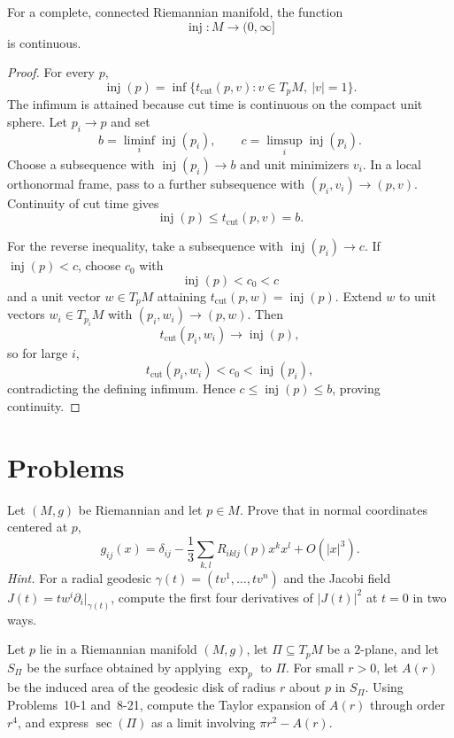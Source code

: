 \begin{proposition}
\label{prop:continuity-injectivity-radius}
For a complete, connected Riemannian manifold, the function
\[
\operatorname{inj}\colon M\longrightarrow(0,\infty]
\]
is continuous.

\begin{proof}
\sketch For every $p$,
\[
\operatorname{inj}(p)
=\inf\{t_{\mathrm{cut}}(p,v):v\in T_pM,\ |v|=1\}.
\]
The infimum is attained because cut time is continuous on the compact unit
sphere. Let $p_i\to p$ and set
\[
b=\liminf_i\operatorname{inj}(p_i),
\qquad
c=\limsup_i\operatorname{inj}(p_i).
\]
Choose a subsequence with $\operatorname{inj}(p_i)\to b$ and unit minimizers
$v_i$. In a local orthonormal frame, pass to a further subsequence with
$(p_i,v_i)\to(p,v)$. Continuity of cut time gives
\[
\operatorname{inj}(p)
\leq t_{\mathrm{cut}}(p,v)
=b.
\]

For the reverse inequality, take a subsequence with
$\operatorname{inj}(p_i)\to c$. If $\operatorname{inj}(p)<c$, choose
$c_0$ with
\[
\operatorname{inj}(p)<c_0<c
\]
and a unit vector $w\in T_pM$ attaining
$t_{\mathrm{cut}}(p,w)=\operatorname{inj}(p)$. Extend $w$ to unit vectors
$w_i\in T_{p_i}M$ with $(p_i,w_i)\to(p,w)$. Then
\[
t_{\mathrm{cut}}(p_i,w_i)\longrightarrow\operatorname{inj}(p),
\]
so for large $i$,
\[
t_{\mathrm{cut}}(p_i,w_i)<c_0<\operatorname{inj}(p_i),
\]
contradicting the defining infimum. Hence
$c\leq\operatorname{inj}(p)\leq b$, proving continuity.
\end{proof}
\end{proposition}
\section{Problems}

\begin{exercise}
\label{prob:taylor-series-metric-tensor}

Let $(M,g)$ be Riemannian and let $p\in M$. Prove that in normal coordinates
centered at $p$,
\[
g_{ij}(x)
=\delta_{ij}-\frac13\sum_{k,l}R_{iklj}(p)x^kx^l+O(|x|^3).
\]
\emph{Hint.} For a radial geodesic
$\gamma(t)=(tv^1,\ldots,tv^n)$ and the Jacobi field
$J(t)=tw^i\partial_i|_{\gamma(t)}$, compute the first four derivatives of
$|J(t)|^2$ at $t=0$ in two ways.
\end{exercise}

\begin{exercise}
\label{prob:area-geodesic-disk}

Let $p$ lie in a Riemannian manifold $(M,g)$, let
$\Pi\subseteq T_pM$ be a $2$-plane, and let
$S_\Pi$ be the surface obtained by applying $\exp_p$ to $\Pi$. For small
$r>0$, let $A(r)$ be the induced area of the geodesic disk of radius $r$
about $p$ in $S_\Pi$. Using Problems~10-1 and~8-21, compute the Taylor
expansion of $A(r)$ through order $r^4$, and express $\sec(\Pi)$ as a limit
involving $\pi r^2-A(r)$.
\end{exercise}

